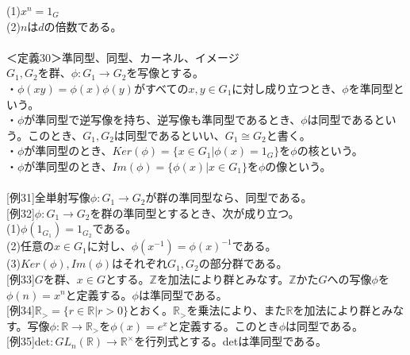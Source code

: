 \documentclass{jsarticle}
\begin{document}
\hspace{5mm}(1)\(x^{n}=1_{G}\)\\
\hspace{5mm}(2)\(n\)は\(d\)の倍数である。\\
\\
＜定義30＞準同型、同型、カーネル、イメージ\\
\(G_{1},G_{2}\)を群、\(\phi:G_{1}\rightarrow G_{2}\)を写像とする。\\
・\(\phi(xy)=\phi(x)\phi(y)\)がすべての\(x,y\in G_{1}\)に対し成り立つとき、\(\phi\)を準同型という。\\
・\(\phi\)が準同型で逆写像を持ち、逆写像も準同型であるとき、\(\phi\)は同型であるという。このとき、\(G_{1},G_{2}\)は同型であるといい、\(G_{1}\cong G_{2}\)と書く。\\
・\(\phi\)が準同型のとき、\(Ker(\phi)=\{x\in G_{1}|\phi(x)=1_{G}\}\)を\(\phi\)の核という。\\
・\(\phi\)が準同型のとき、\(Im(\phi)=\{\phi(x)|x\in G_{1}\}\)を\(\phi\)の像という。\\
\\
\hspace{5mm}[例31]全単射写像\(\phi:G_{1}\rightarrow G_{2}\)が群の準同型なら、同型である。\\
\hspace{5mm}[例32]\(\phi:G_{1}\rightarrow G_{2}\)を群の準同型とするとき、次が成り立つ。\\
\hspace{5mm}(1)\(\phi(1_{G_{1}})=1_{G_{2}}\)である。\\
\hspace{5mm}(2)任意の\(x\in G_{1}\)に対し、\(\phi(x^{-1})=\phi(x)^{-1}\)である。\\
\hspace{5mm}(3)\(Ker(\phi),Im(\phi)\)はそれぞれ\(G_{1},G_{2}\)の部分群である。\\
\hspace{5mm}[例33]\(G\)を群、\(x\in G\)とする。\(\mathbb{Z}\)を加法により群とみなす。\(\mathbb{Z}\)かた\(G\)への写像\(\phi\)を\(\phi(n)=x^{n}\)と定義する。\(\phi\)は準同型である。\\
\hspace{5mm}[例34]\(\mathbb{R}_{>}=\{r\in\mathbb{R}|r>0\}\)とおく。\(\mathbb{R}_{>}\)を乗法により、また\(\mathbb{R}\)を加法により群とみなす。写像\(\phi:\mathbb{R}\rightarrow\mathbb{R}_{>}\)を\(\phi(x)=e^{x}\)と定義する。このとき\(\phi\)は同型である。\\
\hspace{5mm}[例35]det\(:GL_{n}(\mathbb{R})\rightarrow\mathbb{R}^{\times}\)を行列式とする。detは準同型である。\\
\end{document}
